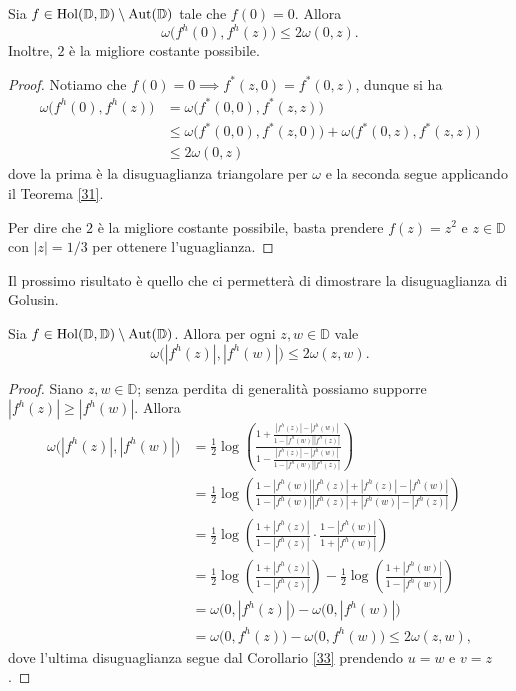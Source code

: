 \begin{cor} \label{36}
  Sia $f \in \text{\normalfont{Hol}}(\mathbb{D},\mathbb{D})\setminus\text{\normalfont{Aut}}(\mathbb{D})$ tale che $f(0)=0$. Allora
  \begin{equation}
    \omega\bigl(f^h(0),f^h(z)\bigr) \le 2\omega(0,z).
  \end{equation}
  Inoltre, $2$ è la migliore costante possibile.
\end{cor}

\begin{proof}
  Notiamo che $f(0)=0 \implies f^*(z,0)=f^*(0,z)$, dunque si ha
  \begin{align*}
    \omega\bigl(f^h(0),f^h(z)\bigr) & = \omega\bigl(f^*(0,0),f^*(z,z)\bigr) \\
    & \le \omega\bigl(f^*(0,0),f^*(z,0)\bigr)+\omega\bigl(f^*(0,z),f^*(z,z)\bigr) \\
    & \le 2\omega(0,z)
  \end{align*}
  dove la prima è la disuguaglianza triangolare per $\omega$ e la seconda segue applicando il Teorema \ref{31}.

  Per dire che $2$ è la migliore costante possibile, basta prendere $f(z)=z^2$ e $z \in \mathbb{D}$ con $|z|=1/3$ per ottenere l'uguaglianza.
\end{proof}

Il prossimo risultato è quello che ci permetterà di dimostrare la disuguaglianza di Golusin.

\begin{cor} \label{quasigolusin}
  Sia $f \in \text{\normalfont{Hol}}(\mathbb{D},\mathbb{D})\setminus\text{\normalfont{Aut}}(\mathbb{D})$. Allora per ogni $z, w \in \mathbb{D}$ vale
  \begin{equation} \label{quasigol}
    \omega\bigl(|f^h(z)|, |f^h(w)|\bigr) \le 2\omega(z,w).
  \end{equation}
\end{cor}

\begin{proof}
  Siano $z, w \in \mathbb{D}$; senza perdita di generalità possiamo supporre $|f^h(z)| \ge |f^h(w)|$. Allora
  \begin{align*}
    \omega\bigl(|f^h(z)|, |f^h(w)|\bigr) & =\frac{1}{2}\log\left(\frac{1+\frac{|f^h(z)|-|f^h(w)|}{1-|f^h(w)||f^h(z)|}}{1-\frac{|f^h(z)|-|f^h(w)|}{1-|f^h(w)||f^h(z)|}}\right) \\
    & =\frac{1}{2}\log\left(\frac{1-|f^h(w)||f^h(z)|+|f^h(z)|-|f^h(w)|}{1-|f^h(w)||f^h(z)|+|f^h(w)|-|f^h(z)|}\right) \\
    & =\frac{1}{2}\log\left(\frac{1+|f^h(z)|}{1-|f^h(z)|}\cdot\frac{1-|f^h(w)|}{1+|f^h(w)|}\right) \\
    & =\frac{1}{2}\log\left(\frac{1+|f^h(z)|}{1-|f^h(z)|}\right)-\frac{1}{2}\log\left(\frac{1+|f^h(w)|}{1-|f^h(w)|}\right) \\
    & =\omega\bigl(0,|f^h(z)|\bigr)-\omega\bigl(0,|f^h(w)|\bigr) \\
    & =\omega\bigl(0,f^h(z)\bigr)-\omega\bigl(0,f^h(w)\bigr) \le 2\omega(z,w),
  \end{align*}
  dove l'ultima disuguaglianza segue dal Corollario \ref{33} prendendo $u=w$ e $v=z$.
\end{proof}


